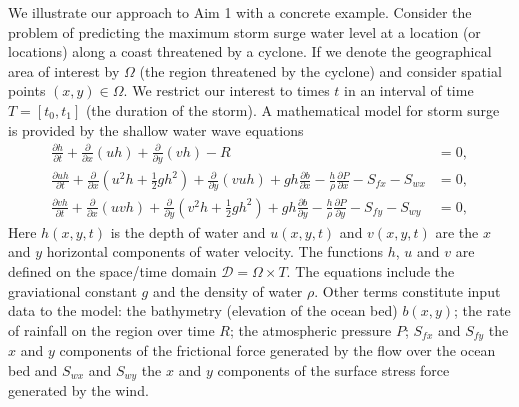 


We illustrate our approach to Aim 1 with a concrete example. Consider the problem of predicting the maximum 
storm surge water level at a location (or locations) along a coast threatened by a cyclone. If we denote the geographical area of interest by $\Omega$ 
(the region threatened by the cyclone) and consider 
spatial points $(x,y) \in \Omega$. We restrict our interest to times $t$ in an interval of time $T = [t_0, t_1]$ (the duration of the storm). 
A mathematical model for storm surge is provided 
by the shallow water wave equations~\parencite{tan1992shallow}
\begin{subequations}
 \label{eqn:storm} 
\begin{align}
\frac{\partial h}{\partial t} +
\frac{\partial }{\partial x} \left(uh\right) + \frac{\partial }{\partial y} \left(vh\right) -R & =  0 ,\\
\frac{\partial uh}{\partial t} +
\frac{\partial }{\partial x} \left(u^2h +  \frac12 gh^2 \right) 
+ \frac{\partial }{\partial y} \left(vuh\right) + gh \frac{\partial b}{\partial x} 
- \frac{h}{\rho} \frac{\partial P}{\partial  x} - S_{fx} - S_{wx}  &= 0 ,   \\
\frac{\partial vh}{\partial t} +
\frac{\partial }{\partial x} \left(uvh  \right) 
+ \frac{\partial }{\partial y} \left(v^2h + \frac12 g h^2 \right) + gh \frac{\partial b}{\partial y} 
- \frac{h}{\rho} \frac{\partial P}{\partial  y} - S_{fy} -  S_{wy}& = 0,  
\end{align}
\end{subequations}
Here $h(x,y,t)$ is the depth of water and $u(x,y,t)$ and $v(x,y,t)$ are the $x$ and $y$ horizontal components of water velocity. 
The functions $h$, $u$ and $v$ are defined on the space/time domain  $ \mathcal{D} = \Omega \times T$. 
The equations include the graviational constant $g$ and the density of water $\rho$. Other terms constitute input data to the model: the bathymetry  (elevation of the ocean bed)  $b(x,y)$; the rate of rainfall on the region over time $R$; the atmospheric pressure $P$; %
$S_{fx}$ and $S_{fy}$ the $x$ and $y$ components of the frictional force generated by the flow over the ocean bed 
 and $S_{wx}$ and $S_{wy}$ the $x$ and $y$ components of the surface stress force generated by the wind.



